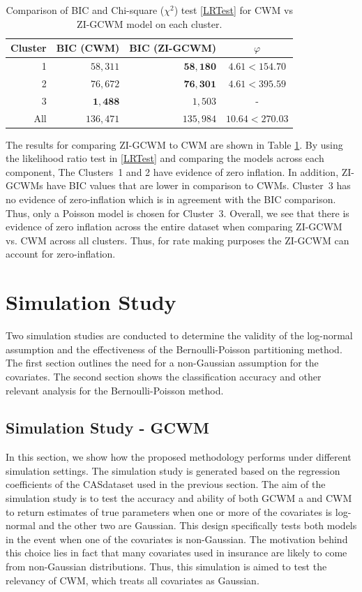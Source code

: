 \documentclass[12pt,letterpaper]{article}
\numberwithin{equation}{section}
\numberwithin{equation}{section}
\numberwithin{equation}{section}
\begin{document}
\begin{table}[!htb]
 \begin{center}
\caption{Comparison of BIC and Chi-square ($\chi^2$) test \eqref{LRTest} for CWM vs ZI-GCWM model on each cluster. }
\label{compareResults_models}
\begin{tabular}{r|rrc}
\hline
Cluster & BIC (CWM)  & BIC (ZI-GCWM) &  $\varphi $\\
\hline
 1 & $58,311$ & $\bm{58,180}$ & $ 4.61 < 154.70$ \\
 2 & $76,672$ & $\bm{76,301}$ & $ 4.61 < 395.59 $\\
 3 & $\bm{1,488}$  & $1,503$ &  -  \\ 
\hline 
All & $136,471$ & $135,984$ &  $10.64 < 270.03$
  \\
\hline
\end{tabular}
\end{center}
\end{table}
The results for comparing ZI-GCWM to CWM are shown in Table \ref{compareResults_models}. By using the likelihood ratio test in \eqref{LRTest} and comparing the models across each component, The Clusters~1 and 2 have evidence of zero inflation. In addition, ZI-GCWMs have BIC values that are lower in comparison to CWMs.  Cluster~3 has no evidence of zero-inflation which is in agreement with the BIC comparison. Thus, only a Poisson model is chosen for Cluster~3.  Overall, we see that there is evidence of zero inflation across the entire dataset when comparing ZI-GCWM vs. CWM across all clusters. 
Thus, for rate making purposes the ZI-GCWM can account for zero-inflation.


\section{Simulation Study}\label{sec:sim}

Two simulation studies are conducted to determine the validity of the log-normal assumption and the effectiveness of the Bernoulli-Poisson partitioning method. The first section outlines the need for a non-Gaussian assumption for the covariates. The second section shows the classification accuracy and other relevant analysis for the Bernoulli-Poisson method.


\subsection{Simulation Study - GCWM}


In this section, we show how the proposed methodology performs under different simulation settings. The simulation study is generated based on the regression coefficients of the CASdataset used in the previous section. The aim of the simulation study is to test the accuracy and ability of both GCWM a and CWM to return estimates of true parameters when one or more of the covariates is log-normal and the other two are Gaussian. This design specifically tests both models in the event when one of the covariates is non-Gaussian. The motivation behind this choice lies in fact that many covariates used in insurance are likely to come from non-Gaussian distributions. Thus, this simulation is aimed to test the relevancy of CWM, which treats all covariates as Gaussian.
\end{document}
